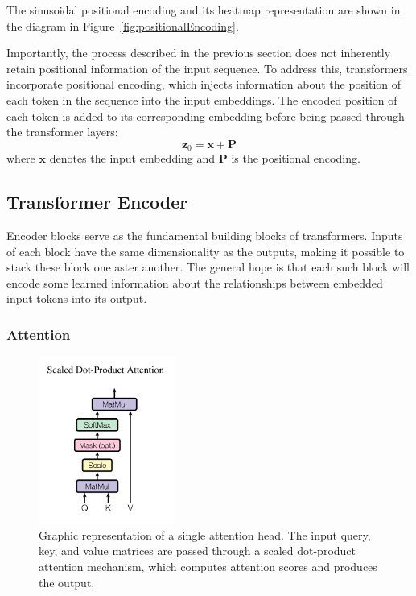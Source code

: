 \documentclass{pracalicmgr}
\begin{document}
The sinusoidal positional encoding and its heatmap representation are shown in the diagram in Figure~\ref{fig:positionalEncoding}.

Importantly, the process described in the previous section does not inherently retain positional information of the input sequence. To address this, transformers incorporate positional encoding, which injects information about the position of each token in the sequence into the input embeddings. The encoded position of each token is added to its corresponding embedding before being passed through the transformer layers:
\[
\mathbf{z}_0 = \mathbf{x} + \mathbf{P}
\]
where \( \mathbf{x} \) denotes the input embedding and \( \mathbf{P} \) is the positional encoding.


\subsection{Transformer Encoder}

Encoder blocks serve as the fundamental building blocks of transformers. Inputs of each block have the same dimensionality as the outputs, making it possible to stack these block one aster another. The general hope is that each such block will encode some learned information about the relationships between embedded input tokens into its output.

\subsubsection{Attention}

\begin{figure}[h]
    \centering
    \includegraphics[width=0.4\textwidth]{src/scaledDotProd.png}
    \caption{Graphic representation of a single attention head. The input query, key, and value matrices are passed through a scaled dot-product attention mechanism, which computes attention scores and produces the output\cite{Vaswani2017Attention}.}
    \label{fig:singleAttentionHead}
\end{figure}
\end{document}
